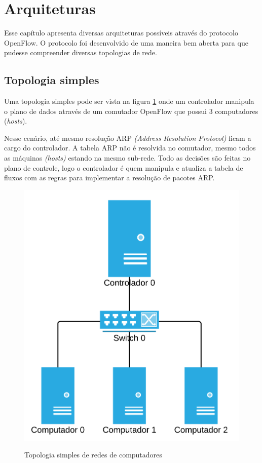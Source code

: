 \break
\section{Arquiteturas}

Esse capítulo apresenta diversas arquiteturas possíveis através do 
protocolo OpenFlow. 
O protocolo foi desenvolvido de uma maneira bem aberta para que pudesse 
compreender diversas topologias de rede. 

\subsection{Topologia simples}

Uma topologia simples pode ser vista na figura \ref{fig:simple-topology} onde
um controlador manipula o plano de dados através de um comutador OpenFlow 
que possui 3 computadores (\emph{hosts}).

Nesse cenário, até mesmo resolução ARP \emph{(Address Resolution Protocol)} 
ficam a cargo do controlador. 
A tabela ARP não é resolvida no comutador, mesmo todos as máquinas 
\emph{(hosts)} estando na mesmo sub-rede. 
Todo as decisões são feitas no plano de controle, logo o controlador 
é quem manipula e atualiza a tabela de fluxos com as regras para 
implementar a resolução de pacotes ARP.

\begin{figure}[!h]
    \centering
    \includegraphics{img/simple-topology}
    \label{fig:simple-topology}
    \caption{Topologia simples de redes de computadores}
\end{figure}


